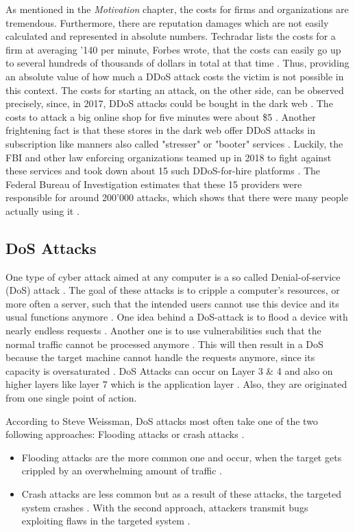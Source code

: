 As mentioned in the \textit{Motivation} chapter, the costs for firms and organizations are tremendous. Furthermore, there are reputation damages which are not easily calculated and represented in absolute numbers. Techradar lists the costs for a firm at averaging '140 per minute, Forbes wrote, that the costs can easily go up to several hundreds of thousands of dollars in total at that time \cite{Techradar-DDoSStatistics, Forbes-DDoSCosts}. Thus, providing an absolute value of how much a DDoS attack costs the victim is not possible in this context. The costs for starting an attack, on the other side, can be observed precisely, since, in 2017, DDoS attacks could be bought in the dark web \cite{Securelist-DDoSCosts}. The costs to attack a big online shop for five minutes were about \$5 \cite{Securelist-DDoSCosts}. Another frightening fact is that these stores in the dark web offer DDoS attacks in subscription like manners also called "stresser" or "booter" services \cite{Securelist-DDoSCosts}. Luckily, the FBI and other law enforcing organizations teamed up in 2018 to fight against these services and took down about 15 such DDoS-for-hire platforms \cite{Forbes-DDoSCosts}. The Federal Bureau of Investigation estimates that these 15 providers were responsible for around 200'000 attacks, which shows that there were many people actually using it \cite{Forbes-DDoSCosts}. 

\subsection{DoS Attacks}
One type of cyber attack aimed at any computer is a so called Denial-of-service (DoS) attack \cite{DoS-Explained}. The goal of these attacks is to cripple a computer's resources, or more often a server, such that the intended users cannot use this device and its usual functions anymore \cite{DoS-Explained}. One idea behind a DoS-attack is to flood a device with nearly endless requests \cite{DoS-Explained}. Another one is to use vulnerabilities such that the normal traffic cannot be processed anymore \cite{DoS-Explained}. This will then result in a DoS because the target machine cannot handle the requests anymore, since its capacity is oversaturated \cite{DoS-Explained}. DoS Attacks can occur on Layer 3 \& 4 and also on higher layers like layer 7 which is the application layer \cite{DoS-PCWelt}. Also, they are originated from one single point of action. 

According to Steve Weissman, DoS attacks most often take one of the two following approaches: Flooding attacks or crash attacks \cite{DoS-Norton}.
\begin{itemize}
    \item Flooding attacks are the more common one and occur, when the target gets crippled by an overwhelming amount of traffic \cite{DoS-Norton}.
    \item Crash attacks are less common but as a result of these attacks, the targeted system crashes \cite{DoS-Norton}. With the second approach, attackers transmit bugs exploiting flaws in the targeted system \cite{DoS-Norton}. 
\end{itemize}

